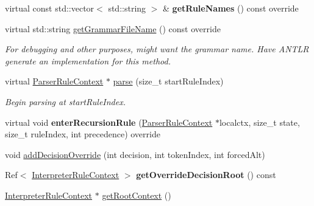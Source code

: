 \begin{DoxyCompactItemize}
virtual const std\+::vector$<$ std\+::string $>$ \& {\bfseries get\+Rule\+Names} () const override
\item 
virtual std\+::string \hyperlink{classantlr4_1_1ParserInterpreter_a14fc40b7791578d486eacffd2c5bb483}{get\+Grammar\+File\+Name} () const override
\begin{DoxyCompactList}\small\item\em For debugging and other purposes, might want the grammar name. Have A\+N\+T\+LR generate an implementation for this method. \end{DoxyCompactList}\item 
\mbox{\label{classantlr4_1_1ParserInterpreter_aaa891c8229fdbebdafc7e6c01cf92b8d}} 
virtual \hyperlink{classantlr4_1_1ParserRuleContext}{Parser\+Rule\+Context} $\ast$ \hyperlink{classantlr4_1_1ParserInterpreter_aaa891c8229fdbebdafc7e6c01cf92b8d}{parse} (size\+\_\+t start\+Rule\+Index)
\begin{DoxyCompactList}\small\item\em Begin parsing at start\+Rule\+Index. \end{DoxyCompactList}\item 
\mbox{\label{classantlr4_1_1ParserInterpreter_af312ed6d85802de4dc8e5344c86089d3}} 
virtual void {\bfseries enter\+Recursion\+Rule} (\hyperlink{classantlr4_1_1ParserRuleContext}{Parser\+Rule\+Context} $\ast$localctx, size\+\_\+t state, size\+\_\+t rule\+Index, int precedence) override
\item 
void \hyperlink{classantlr4_1_1ParserInterpreter_abf60cba91e262b5384871b3b7412367f}{add\+Decision\+Override} (int decision, int token\+Index, int forced\+Alt)
\item 
\mbox{\label{classantlr4_1_1ParserInterpreter_a7cc2c25815fef451c6e2801af9d9470b}} 
Ref$<$ \hyperlink{classantlr4_1_1InterpreterRuleContext}{Interpreter\+Rule\+Context} $>$ {\bfseries get\+Override\+Decision\+Root} () const
\item 
\hyperlink{classantlr4_1_1InterpreterRuleContext}{Interpreter\+Rule\+Context} $\ast$ \hyperlink{classantlr4_1_1ParserInterpreter_a451ec3d6780fe95f9396ffbe582edec2}{get\+Root\+Context} ()
\end{DoxyCompactItemize}
